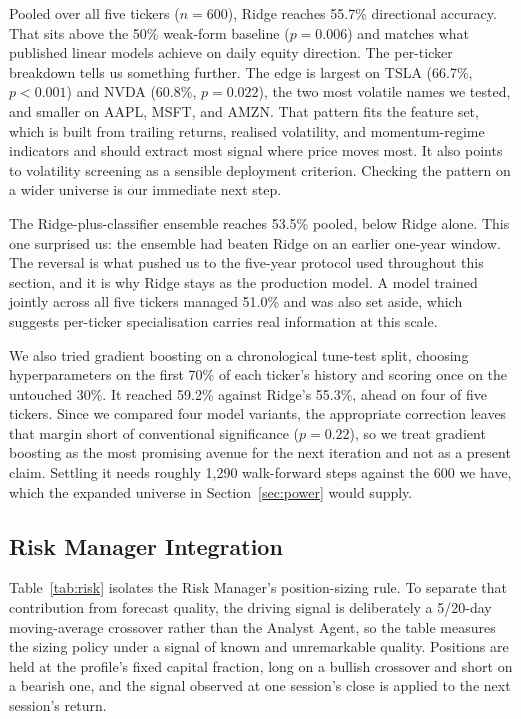 \documentclass[conference]{IEEEtran}
\begin{document}
Pooled over all five tickers ($n=600$), Ridge reaches 55.7\% directional accuracy. That sits above the 50\% weak-form baseline ($p=0.006$) and matches what published linear models achieve on daily equity direction. The per-ticker breakdown tells us something further. The edge is largest on TSLA (66.7\%, $p<0.001$) and NVDA (60.8\%, $p=0.022$), the two most volatile names we tested, and smaller on AAPL, MSFT, and AMZN. That pattern fits the feature set, which is built from trailing returns, realised volatility, and momentum-regime indicators and should extract most signal where price moves most. It also points to volatility screening as a sensible deployment criterion. Checking the pattern on a wider universe is our immediate next step.

The Ridge-plus-classifier ensemble reaches 53.5\% pooled, below Ridge alone. This one surprised us: the ensemble had beaten Ridge on an earlier one-year window. The reversal is what pushed us to the five-year protocol used throughout this section, and it is why Ridge stays as the production model. A model trained jointly across all five tickers managed 51.0\% and was also set aside, which suggests per-ticker specialisation carries real information at this scale.

We also tried gradient boosting on a chronological tune-test split, choosing hyperparameters on the first 70\% of each ticker's history and scoring once on the untouched 30\%. It reached 59.2\% against Ridge's 55.3\%, ahead on four of five tickers. Since we compared four model variants, the appropriate correction leaves that margin short of conventional significance ($p=0.22$), so we treat gradient boosting as the most promising avenue for the next iteration and not as a present claim. Settling it needs roughly 1{,}290 walk-forward steps against the 600 we have, which the expanded universe in Section~\ref{sec:power} would supply.

\subsection{Risk Manager Integration}

Table~\ref{tab:risk} isolates the Risk Manager's position-sizing rule. To separate that contribution from forecast quality, the driving signal is deliberately a 5/20-day moving-average crossover rather than the Analyst Agent, so the table measures the sizing policy under a signal of known and unremarkable quality. Positions are held at the profile's fixed capital fraction, long on a bullish crossover and short on a bearish one, and the signal observed at one session's close is applied to the next session's return.
\end{document}
